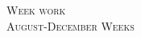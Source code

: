 \documentclass[landscape,a4paper]{article}
\begin{document}
\pagestyle{empty} %

\noindent



\begin{center}
\textsc{\LARGE Week work}\\ 
\textsc{\large August-December Weeks}
\end{center}

\end{document}
